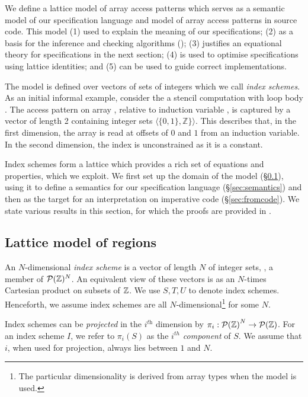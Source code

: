 
\noindent
We define a lattice model of array access patterns which serves as
a semantic model of our specification language and model of array
access patterns in source code. This model (1) used to explain the
meaning of our specifications; (2) as a basis for the inference and
checking algorithms (); (3) justifies an equational
theory for specifications in the next section; (4) is used to optimise
specifications using lattice identities; and (5) can be used to guide
correct implementations.

The model is defined over vectors of sets of integers which we call
\emph{index schemes}.  As an initial informal example, consider the
a stencil computation with loop body .
The access pattern on array , relative
to induction variable , is captured
by a vector of length 2 containing integer sets $\langle{\{0, 1\},
  \mathbb{Z}\}}\rangle$. This describes that, in the first dimension,
the array is read at offsets of $0$ and $1$ from an induction
variable. In the second dimension, the index is unconstrained
as it is a constant.

Index schemes form a lattice which provides a rich set of equations
and properties, which we exploit. We first set up the 
domain of the model (\S\ref{sec:domain}), using it to define a semantics
for our specification language (\S\ref{sec:semantics}) and then as
the target for an interpretation on imperative code (\S\ref{sec:fromcode}).
We state various results in this section, for which the proofs are
provided in .

\subsection{Lattice model of regions}
\label{sec:domain} 


\begin{defn}
  An $N$-dimensional \emph{index scheme} is a vector of length $N$ of
  integer sets, \ie{}, a member of $\mathcal{P}(\textnormal{$\mathbb{Z}$})^{N}$.
  An equivalent view of these vectors is as an $N$-times Cartesian
  product on subsets of $\textnormal{$\mathbb{Z}$}$.
  We use $S, T, U$ to denote index schemes. Henceforth, we assume index schemes
  are all $N$-dimensional\footnote{The particular
    dimensionality is derived from array types when the model is
    used.} for some $N$.

  Index schemes can be \emph{projected} in the $i^{\textit{th}}$ dimension by
  $\pi_i : {\mathcal{P}(\textnormal{$\mathbb{Z}$}{})}^N \to \mathcal{P}(\textnormal{$\mathbb{Z}$}{})$. For an index scheme
  $I$, we refer to $\pi_i(S)$ as the \emph{$i^{th}$ component} of $S$. We assume
  that $i$, when used for projection, always lies between $1$ and $N$.
\end{defn}


